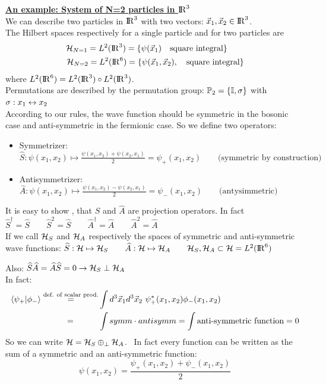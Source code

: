 \vspace{20pt}
\underline{\textbf{An example: System of N=2 particles in ${\rm I\!R}^3$}}\\
We can describe two particles in ${\rm I\!R}^3$ with two vectors: $\vec x_1, \vec x_2 \in {\rm I\!R}^3$.\\
The Hilbert spaces respectively for a single particle and for two particles are 
\begin{align*}
    \mathcal{H}_{N=1} = L^2({\rm I\!R}^3) = \{\psi(\vec x_1)\quad \text{square integral}\} \qquad\\
    \mathcal{H}_{N=2} = L^2({\rm I\!R}^6) = \{\psi(\vec x_1, \vec x_2), \quad \text{square integral}\}
\end{align*}
where $L^2({\rm I\!R}^6) = L^2({\rm I\!R}^3) \circ L^2({\rm I\!R}^3)$.\\
Permutations are described by the permutation group: $\mathbb{P}_2 = \{\mathbb{I}, \sigma\}$ \quad with $\sigma : x_1 \leftrightarrow x_2$\\
According to our rules, the wave function should be symmetric in the bosonic case and anti-symmetric in the fermionic case. So we define two operators:
\begin{itemize}
    \item Symmetrizer: $\widehat S: \psi(x_1,x_2) \mapsto \frac{\psi(x_1,x_2) + \psi(x_2, x_1)}2 = \psi_+(x_1,x_2) \qquad \text{(symmetric by construction)}$
    \item Antisymmetrizer: $\widehat A : \psi(x_1,x_2) \mapsto \frac{\psi(x_1,x_2) - \psi(x_2, x_1)}2 = \psi_-(x_1,x_2) \qquad \text{(antysimmetric)}$
\end{itemize}

It is easy to show , that $\widehat S$ and $\widehat A$ are projection operators. In fact $\widehat S^\dag = \widehat S \qquad \widehat S^2 = \widehat S \qquad \widehat A^\dag = \widehat A \qquad \widehat A ^2 = \widehat A$\\
If we call $\mathcal{H}_S$ and $\mathcal{H}_A$ respectively the spaces of symmetric and anti-symmetric wave functions: $\widehat S : \mathcal{H} \mapsto \mathcal{H}_S \qquad \widehat A: \mathcal{H} \mapsto \mathcal{H}_A \qquad \mathcal{H}_S, \mathcal{H}_A \subset \mathcal{H} = L^2({\rm I\!R}^6)$

Also: $\widehat S \widehat A = \widehat A \widehat S = 0 \rightarrow \mathcal{H}_S \perp \mathcal{H}_A$\\
In fact: 
\begin{align*}
    \left\langle \psi_+ \middle| \phi_- \right\rangle \stackrel{\text{def. of scalar prod.}}{=} &\int d^3 \vec x_1 d^3 \vec x_2 \ \psi^*_+ (x_1,x_2) \phi_-(x_1,x_2) \\
    =\qquad \quad  &\int symm \cdot antisymm = \int \text{anti-symmetric function} = 0
\end{align*}
So we can write $\mathcal{H} = \mathcal{H}_S \oplus_\perp \mathcal{H}_A$. \ In fact every function can be written as the sum of a symmetric and an anti-symmetric function:
$$ \psi(x_1, x_2) = \frac{\psi_+(x_1, x_2) + \psi_-(x_1,x_2)}2$$

